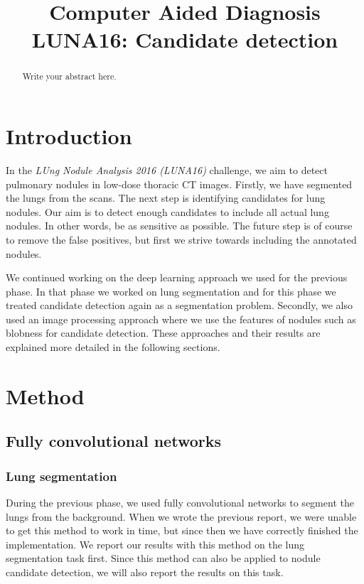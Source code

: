 \documentclass{article}
\title{Computer Aided Diagnosis\\LUNA16: Candidate detection}
\begin{document}
%
\maketitle
%
\begin{abstract}
Write your abstract here.
\end{abstract}


\section{Introduction}
\label{sec:intro}
In the \emph{LUng Nodule Analysis 2016 (LUNA16)} challenge, we aim to detect pulmonary nodules in low-dose thoracic CT images. Firstly, we have segmented the lungs from the scans. The next step is identifying candidates for lung nodules. Our aim is to detect enough candidates to include all actual lung nodules. In other words, be as sensitive as possible. The future step is of course to remove the false positives, but first we strive towards including the annotated nodules.

We continued working on the deep learning approach we used for the previous phase. In that phase we worked on lung segmentation and for this phase we treated candidate detection again as a segmentation problem. Secondly, we also used an image processing approach where we use the features of nodules such as blobness for candidate detection. These approaches and their results are explained more detailed in the following sections.

\section{Method}\label{sec:method}

\subsection{Fully convolutional networks}
\subsubsection{Lung segmentation}
During the previous phase, we used fully convolutional networks \cite{long} to segment the lungs from the background. When we wrote the previous report, we were unable to get this method to work in time, but since then we have correctly finished the implementation. We report our results with this method on the lung segmentation task first. Since this method can also be applied to nodule candidate detection, we will also report the results on this task.
\end{document}
